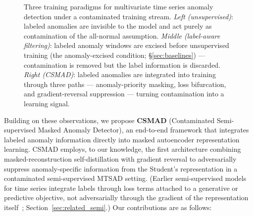 \begin{figure}[tbp]
  \centering
  \caption{Three training paradigms for multivariate time series anomaly detection under a
    contaminated training stream.
    \textit{Left (unsupervised)}: labeled anomalies are invisible to the model and act purely
    as contamination of the all-normal assumption.
    \textit{Middle (label-aware filtering)}: labeled anomaly windows are excised before
    unsupervised training (the anomaly-excised condition; \S\ref{sec:baselines}) ---
    contamination is removed but the label information is discarded.
    \textit{Right (CSMAD)}: labeled anomalies are integrated into training through three
    paths --- anomaly-priority masking, loss bifurcation, and gradient-reversal suppression
    --- turning contamination into a learning signal.}
  \label{fig:setting}
\end{figure}

Building on these observations, we propose \textbf{CSMAD} (Contaminated Semi-supervised Masked Anomaly Detector), an end-to-end framework that integrates labeled anomaly information directly into masked autoencoder representation learning.
CSMAD employs, to our knowledge, the first architecture combining masked-reconstruction self-distillation with gradient reversal to adversarially suppress anomaly-specific information from the Student's representation in a contaminated semi-supervised MTSAD setting.
(Earlier semi-supervised models for time series integrate labels through loss terms attached to a generative or predictive objective, not adversarially through the gradient of the representation itself~\cite{xue2022fewpositive,huang2022slavae}; Section~\ref{sec:related_semi}.)
Our contributions are as follows:

